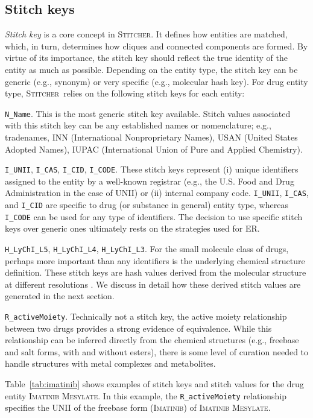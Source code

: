 \documentclass{bmcart}
\newcommand\st{\textsc{Stitcher}}
\begin{document}
\subsection*{Stitch keys}\label{sec:stitch-keys}
\emph{Stitch key} is a core concept in \st. It defines how entities are
matched, which, in turn, determines how cliques and connected
components are formed. By virtue of its importance, the stitch key
should reflect the true identity of the entity as much as possible.
Depending on the entity type, the stitch key can be generic (e.g.,
synonym) or very specific (e.g., molecular hash key). For drug entity
type, \st\ relies on the following stitch keys for each entity: 
\begin{description}
\item{\texttt{N\_Name}.} This is the most generic stitch key
available. Stitch values associated with this stitch key can be any
established names or nomenclature; e.g., tradenames, INN
(International Nonproprietary Names), USAN (United States Adopted
Names), IUPAC (International Union of Pure and Applied Chemistry). 
\item{\texttt{I\_UNII}, \texttt{I\_CAS}, \texttt{I\_CID}, \texttt{I\_CODE}.}
These stitch keys represent (i) unique identifiers assigned to the entity by
a well-known registrar (e.g., the U.S. Food and Drug Administration in
the case of UNII) or (ii) internal company code. \texttt{I\_UNII},
\texttt{I\_CAS}, and \texttt{I\_CID} are specific to drug (or
substance in general) entity type, whereas \texttt{I\_CODE} can be
used for any type of identifiers. The decision to use specific stitch
keys over generic ones ultimately rests on the strategies used for ER.
\item{\texttt{H\_LyChI\_L5}, \texttt{H\_LyChI\_L4}, \texttt{H\_LyChI\_L3}.}
For the small molecule class of drugs, perhaps more important than any
identifiers is the underlying chemical structure definition. These
stitch keys are hash values derived from the molecular structure at
different resolutions \cite{lychi}. We discuss in detail how these
derived stitch values are generated in the next section.
\item{\texttt{R\_activeMoiety}.} Technically not a stitch key, the
active moiety relationship between two drugs provides a strong
evidence of equivalence. While this relationship can be inferred
directly from the chemical structures (e.g., freebase and salt forms,
with and without esters), there is some level of curation needed to
handle structures with metal complexes and metabolites. 
\end{description}
Table~\ref{tab:imatinib} shows examples of stitch keys and stitch values for
the drug entity \textsc{Imatinib Mesylate}. In this example,
the \texttt{R\_activeMoiety} relationship specifies the UNII of the
freebase form (\textsc{Imatinib}) of \textsc{Imatinib Mesylate}.
\end{document}
